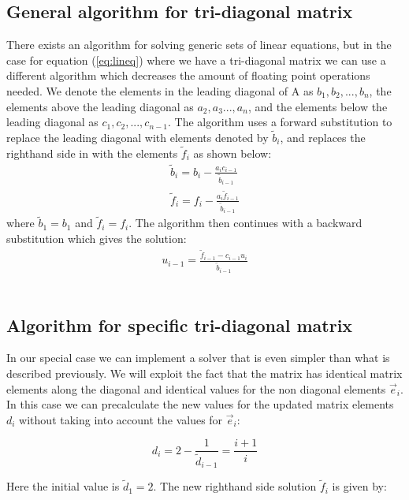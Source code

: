 \documentclass[norsk,a4paper,12pt]{article}
\begin{document}
\subsection{General algorithm for tri-diagonal matrix}

There exists an algorithm for solving generic sets of linear equations, but in the case for equation (\ref{eq:lineq})  where we have a tri-diagonal matrix we can use a different algorithm which decreases the amount of floating point operations needed. We denote the elements in the leading diagonal of A as $b_1, b_2, ..., b_n$, the elements above the leading diagonal as $a_2, a_3 ..., a_n$, and the elements below the leading diagonal as $c_1, c_2, ..., c_{n-1}$. The algorithm uses a forward substitution to replace the leading diagonal with elements denoted by $\tilde{b}_i$, and replaces the righthand side in with the elements $\tilde{f}_i$ as shown below:
\begin{align*}
\tilde{b}_i=b_i-\frac{a_ic_{i-1}}{\tilde{b}_{i-1}} \\
\tilde{f}_i=f_i-\frac{a_i\tilde{f}_{i-1}}{\tilde{b}_{i-1}}
\end{align*}
where $\tilde{b}_1=b_1$ and $\tilde{f}_i=f_i$. The algorithm then continues with a backward substitution which gives the solution:
\begin{align}
u_{i-1}=\frac{\tilde{f}_{i-1}-c_{i-1}u_i}{\tilde{b}_{i-1}}
\end{align}
\\

\subsection{Algorithm for specific tri-diagonal matrix}

In our special case we can implement a solver that is even simpler than what is described previously.  We will exploit the fact that the matrix has identical matrix elements along the diagonal and identical values for the non diagonal elements $\vec{e}_i$. In this case we can precalculate the new values for the updated matrix elements $d_i$ without taking into account the values for $\vec{e}_i$:

\begin{equation}
d_i = 2-\frac{1}{\tilde{d}_{i-1}}=\frac{i+1}{i}
 \label{eq:d_i}
 \end{equation}

Here the initial value is $\tilde{d}_1=2$. The new righthand side solution $\tilde{f}_i$ is given by:
\end{document}
